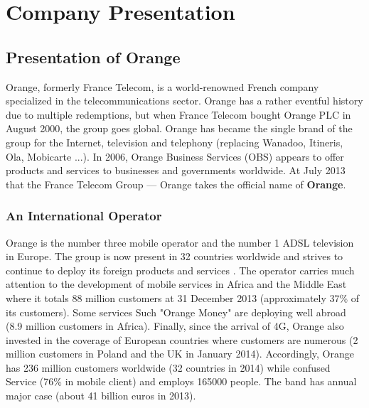 
\chapter{Company Presentation} %

\label{Chapter2} %




\section{Presentation of Orange}
Orange, formerly France Telecom\cite{benilde2010portrait}, is a world-renowned French company specialized in the telecommunications sector. Orange has a rather eventful history due to multiple redemptions, but when France Telecom bought Orange PLC in August 2000, the group goes global. Orange has became the single brand of the group for the Internet, television and telephony (replacing Wanadoo, Itineris, Ola, Mobicarte ...). In 2006, Orange Business Services (OBS) appears to offer products and services to businesses and governments worldwide. At July 2013 that the France Telecom Group --- Orange takes the official name of \textbf{Orange}\cite{bertolus2003qui}.

\subsection{An International Operator}
Orange is the number three mobile operator and the number 1 ADSL television in Europe. The group is now present in 32 countries worldwide and strives to continue to deploy its foreign products and services . The operator carries much attention to the development of mobile services in Africa\cite{jaffre2005afrique} and the Middle East where it totals 88 million customers at 31 December 2013 (approximately 37\% of its customers). Some services Such "Orange Money" are deploying well abroad (8.9 million customers in Africa). Finally, since the arrival of 4G, Orange also invested in the coverage of European countries where customers are numerous (2 million customers in Poland and the UK in January 2014). Accordingly, Orange has 236 million customers worldwide (32 countries in 2014) while confused Service (76\% in mobile client) and employs 165000 people. The band has annual major case (about 41 billion euros in 2013).

